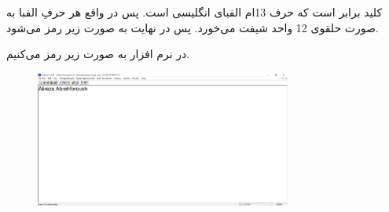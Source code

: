 \documentclass{article}
\begin{document}
\section{}%
\subsection{}
\subsubsection{}
کلید  برابر  است که حرف 13ام الفبای انگلیسی است. پس در واقع هر حرفِ الفبا به صورت حلقوی 12 واحد شیفت می‌خورد. پس در نهایت به صورت زیر رمز می‌شود.
\begin{latin}
\begin{table}[H]
\centering
{}
\end{table}
\end{latin}
در نرم افزار  به صورت زیر رمز می‌کنیم.
\begin{figure}[H]
    \centering
    \includegraphics[width=0.75\textwidth]{figures/1a.jpg}
    \caption
	{}
    \label{fig:fig1}
\end{figure}
\end{document}

